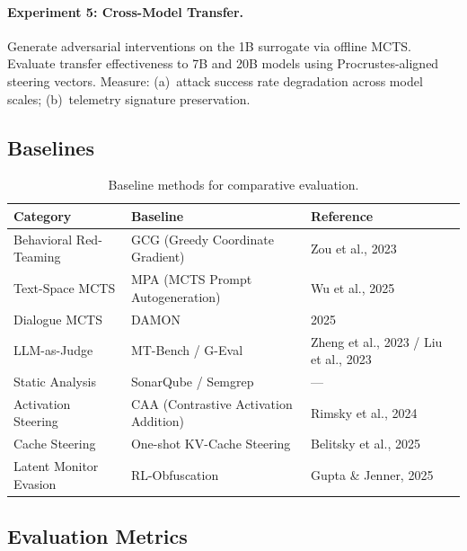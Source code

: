 \documentclass{article}
\begin{document}
\paragraph{Experiment 5: Cross-Model Transfer.}
Generate adversarial interventions on the 1B surrogate via offline MCTS. Evaluate transfer effectiveness to 7B and 20B models using Procrustes-aligned steering vectors. Measure: (a)~attack success rate degradation across model scales; (b)~telemetry signature preservation.

\subsection{Baselines}

\begin{table}[h]
\centering
\begin{tabular}{@{}lll@{}}
\toprule
\textbf{Category} & \textbf{Baseline} & \textbf{Reference} \\
\midrule
Behavioral Red-Teaming & GCG (Greedy Coordinate Gradient) & Zou et al., 2023 \\
Text-Space MCTS & MPA (MCTS Prompt Autogeneration) & Wu et al., 2025 \\
Dialogue MCTS & DAMON & 2025 \\
LLM-as-Judge & MT-Bench / G-Eval & Zheng et al., 2023 / Liu et al., 2023 \\
Static Analysis & SonarQube / Semgrep & --- \\
Activation Steering & CAA (Contrastive Activation Addition) & Rimsky et al., 2024 \\
Cache Steering & One-shot KV-Cache Steering & Belitsky et al., 2025 \\
Latent Monitor Evasion & RL-Obfuscation & Gupta \& Jenner, 2025 \\
\bottomrule
\end{tabular}
\caption{Baseline methods for comparative evaluation.}
\label{tab:baselines}
\end{table}

\subsection{Evaluation Metrics}
\end{document}
